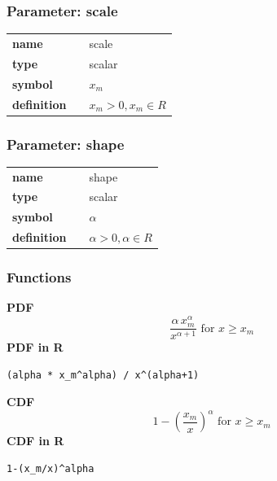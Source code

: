 \subsubsection*{Parameter: scale}

\noindent\begin{tabular}{p{2cm}cl}
\textbf{name} & & scale \\
\textbf{type} & & scalar \\
\textbf{symbol} & & $x_m$  \\
\textbf{definition} & & $x_m > 0, x_m \in R$
\end{tabular}
\subsubsection*{Parameter: shape}

\noindent\begin{tabular}{p{2cm}cl}
\textbf{name} & & shape \\
\textbf{type} & & scalar \\
\textbf{symbol} & & $\alpha$  \\
\textbf{definition} & & $\alpha > 0, \alpha \in R$
\end{tabular}
\subsubsection*{Functions}

\smallskip \noindent \hspace{.2cm} \textbf{PDF} 
\begin{equation*}\frac{\alpha\,x_m^\alpha}{x^{\alpha+1}}\text{ for }x\ge x_m\end{equation*}
\smallskip \noindent \hspace{.2cm} \textbf{PDF in R}  
\begin{verbatim}(alpha * x_m^alpha) / x^(alpha+1)\end{verbatim}
\smallskip \noindent \hspace{.2cm} \textbf{CDF} 
\begin{equation*}1-\left(\frac{x_m}{x}\right)^\alpha \text{ for } x \ge x_m\end{equation*}
\smallskip \noindent \hspace{.2cm} \textbf{CDF in R} 
\begin{verbatim}1-(x_m/x)^alpha\end{verbatim}
\smallskip
